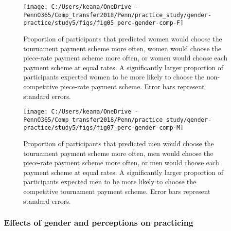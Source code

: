 \documentclass[letterpaper, nobind]{templates/ociamthesis}
\begin{document}
\begin{figure}

{\centering \texttt{[image: C:/Users/keana/OneDrive - PennO365/Comp\_transfer2018/Penn/practice\_study/gender-practice/study5/figs/fig05\_perc-gender-comp-F]} 

}

\caption{Proportion of participants that predicted women would choose the tournament payment scheme more often, women would choose the piece-rate payment scheme more often, or women would choose each payment scheme at equal rates. A significantly larger proportion of participants expected women to be more likely to choose the non-competitive piece-rate payment scheme. Error bars represent standard errors.}\label{fig:s408}
\end{figure}

\begin{figure}

{\centering \texttt{[image: C:/Users/keana/OneDrive - PennO365/Comp\_transfer2018/Penn/practice\_study/gender-practice/study5/figs/fig07\_perc-gender-comp-M]} 

}

\caption{Proportion of participants that predicted men would choose the tournament payment scheme more often, men would choose the piece-rate payment scheme more often, or men would choose each payment scheme at equal rates. A significantly larger proportion of participants expected men to be more likely to choose the competitive tournament payment scheme. Error bars represent standard errors.}\label{fig:s409}
\end{figure}

\hypertarget{effects-of-gender-and-perceptions-on-practicing-4}{%
\subsubsection{Effects of gender and perceptions on practicing}\label{effects-of-gender-and-perceptions-on-practicing-4}}
\end{document}
